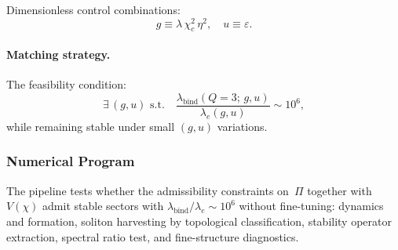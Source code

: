     Dimensionless control combinations:
    \begin{equation}
      g \equiv \lambda\,\chi_c^2\,\eta^2,
      \quad
      u \equiv \varepsilon.
      \label{eq:dimensionless_controls}
    \end{equation}

    \paragraph{Matching strategy.}
      \label{matching-strategy-using-the-proton-to-electron-ratio}
      The feasibility condition:
    \begin{equation}
      \exists\,(g,u)
      \text{ s.t.}\quad
      \frac{\lambda_{\mathrm{bind}}(Q{=}3;\,g,u)}
      {\lambda_e(g,u)}
      \sim 10^6,
      \label{eq:feasibility_condition_lambda_eta}
      \end{equation}
      while remaining stable under small $(g,u)$ variations.

  \subsubsection*{Numerical Program}
    \label{subsec:numerical_program_mass_ratio}

    The pipeline tests whether the admissibility constraints on~$\Pi$
    together with $V(\chi)$ admit stable sectors with
    $\lambda_{\mathrm{bind}}/\lambda_e \sim 10^6$ without fine-tuning:
    dynamics and formation, soliton harvesting by topological
    classification, stability operator extraction, spectral ratio test,
    and fine-structure diagnostics.
